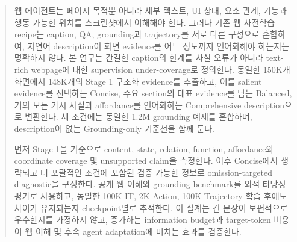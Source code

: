 \begin{abstract}
웹 에이전트는 페이지 목적뿐 아니라 세부 텍스트, UI 상태, 요소
관계, 기능과 행동 가능한 위치를 스크린샷에서 이해해야 한다.
그러나 기존 웹 사전학습 recipe는 caption, QA, grounding과
trajectory를 서로 다른 구성으로 혼합하여, 자연어 description이
화면 evidence를 어느 정도까지 언어화해야 하는지는 명확하지 않다.
본 연구는 간결한 caption의 한계를 사실 오류가 아니라 text-rich
webpage에 대한 supervision under-coverage로 정의한다. 동일한
150K개 화면에서 148K개의 Stage 1 구조화 evidence를 추출하고,
이를 salient evidence를 선택하는 Concise, 주요 section의 대표
evidence를 담는 Balanced, 거의 모든 가시 사실과 affordance를
언어화하는 Comprehensive description으로 변환한다. 세 조건에는
동일한 1.2M grounding 예제를 혼합하며, description이 없는
Grounding-only 기준선을 함께 둔다.

먼저 Stage 1을 기준으로 content, state, relation, function,
affordance와 coordinate coverage 및 unsupported claim을 측정한다.
이후 Concise에서 생략되고 더 포괄적인 조건에 포함된 검증 가능한
정보로 omission-targeted diagnostic을 구성한다. 공개 웹 이해와
grounding benchmark를 외적 타당성 평가로 사용하고, 동일한 100K
IT, 2K Action, 100K Trajectory 학습 후에도 차이가 유지되는지
checkpoint별로 추적한다. 이 설계는 긴 문장이 보편적으로 우수한지를
가정하지 않고, 증가하는 information budget과 target-token 비용이
웹 이해 및 후속 agent adaptation에 미치는 효과를 검증한다.
\end{abstract}
